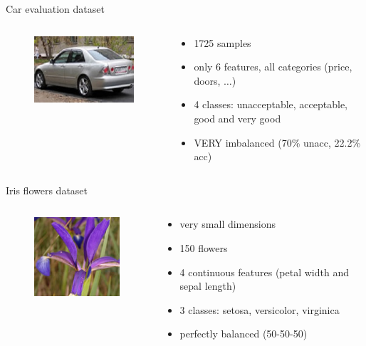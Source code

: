 \documentclass[english]{beamer}
\begin{document}
\begin{frame}{Car evaluation dataset}
	\begin{columns}
		\begin{column}{0.35\textwidth}
			\begin{figure}
				\centering
				\includegraphics[scale=1]{figures/car.jpg}
			\end{figure}
		\end{column}
		
		\begin{column}{0.65\textwidth}
			\begin{itemize}
				\item 1725 samples
				\item only 6 features, all categories (price, doors, $\ldots$)
				\item 4 classes: unacceptable, acceptable, good and very good
				\item VERY imbalanced (70\% unacc, 22.2\% acc)
			\end{itemize}
		\end{column}
	\end{columns}
\end{frame}

\begin{frame}{Iris flowers dataset}
	\begin{columns}
		\begin{column}{0.35\textwidth}
			\begin{figure}
				\centering
				\includegraphics[scale=0.75]{figures/iris.jpg}
			\end{figure}
		\end{column}
		
		\begin{column}{0.65\textwidth}
			\begin{itemize}
				\item very small dimensions
				\item 150 flowers
				\item 4 continuous features (petal width and sepal length)
				\item 3 classes: setosa, versicolor, virginica
				\item perfectly balanced (50-50-50)
			\end{itemize}
		\end{column}
	\end{columns}
\end{frame}
\end{document}
